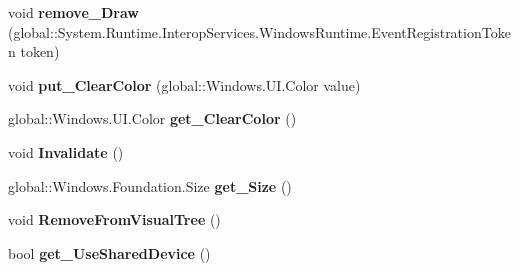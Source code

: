 \begin{DoxyCompactItemize}
void {\bfseries remove\+\_\+\+Draw} (global\+::\+System.\+Runtime.\+Interop\+Services.\+Windows\+Runtime.\+Event\+Registration\+Token token)
\item 
\mbox{\label{interface_microsoft_1_1_graphics_1_1_canvas_1_1_u_i_1_1_xaml_1_1_i_canvas_control_a9b6277e93cd22ec62980077d6054abfa}} 
void {\bfseries put\+\_\+\+Clear\+Color} (global\+::\+Windows.\+U\+I.\+Color value)
\item 
\mbox{\label{interface_microsoft_1_1_graphics_1_1_canvas_1_1_u_i_1_1_xaml_1_1_i_canvas_control_a07569bdb3de20d484ad960b033c65d6d}} 
global\+::\+Windows.\+U\+I.\+Color {\bfseries get\+\_\+\+Clear\+Color} ()
\item 
\mbox{\label{interface_microsoft_1_1_graphics_1_1_canvas_1_1_u_i_1_1_xaml_1_1_i_canvas_control_a58180969617e4c94aa46ad9763ecfbd8}} 
void {\bfseries Invalidate} ()
\item 
\mbox{\label{interface_microsoft_1_1_graphics_1_1_canvas_1_1_u_i_1_1_xaml_1_1_i_canvas_control_a46bc807db80b81ae48b03fe7fd9ef0fc}} 
global\+::\+Windows.\+Foundation.\+Size {\bfseries get\+\_\+\+Size} ()
\item 
\mbox{\label{interface_microsoft_1_1_graphics_1_1_canvas_1_1_u_i_1_1_xaml_1_1_i_canvas_control_a6782a4dab5ff0be4ad3f21faab9d1837}} 
void {\bfseries Remove\+From\+Visual\+Tree} ()
\item 
\mbox{\label{interface_microsoft_1_1_graphics_1_1_canvas_1_1_u_i_1_1_xaml_1_1_i_canvas_control_ab71cfd94041b0c62d1f905ee5fe200b9}} 
bool {\bfseries get\+\_\+\+Use\+Shared\+Device} ()
\item 
\mbox{\label{interface_microsoft_1_1_graphics_1_1_canvas_1_1_u_i_1_1_xaml_1_1_i_canvas_control_a66c9173d29e17dbbb7b5ef1b315bd7a8}} 

\end{DoxyCompactItemize}

